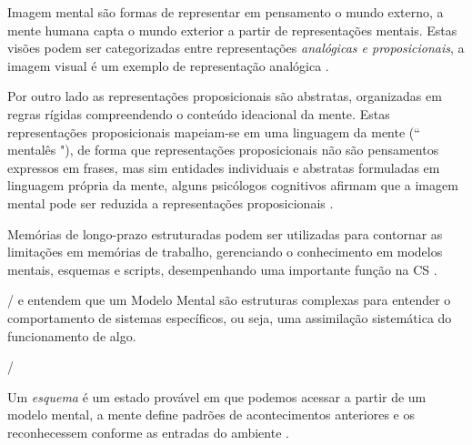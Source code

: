 \documentclass[12pt]{article}
\begin{document}
Imagem mental são formas de representar em pensamento o mundo externo, a mente humana capta o mundo exterior a partir de representações mentais. Estas visões podem ser categorizadas entre representações \textit{analógicas e proposicionais}, a imagem visual é um exemplo de representação analógica \cite{Moreira1996}. 

Por outro lado as representações proposicionais são abstratas, organizadas em regras rígidas compreendendo o conteúdo ideacional da mente. Estas representações proposicionais mapeiam-se em uma linguagem da mente (`` mentalês "), de forma que representações proposicionais não são pensamentos expressos em frases, mas sim entidades individuais e abstratas formuladas em linguagem própria da mente, alguns psicólogos cognitivos afirmam que a imagem mental pode ser reduzida a representações proposicionais  \cite{Moreira1996}.

Memórias de longo-prazo estruturadas podem ser utilizadas para contornar as limitações em memórias de trabalho, gerenciando o conhecimento em modelos mentais, esquemas e scripts, desempenhando uma importante função na CS \cite{Endsley1995}. 

/%
\cite{Endsley1995} e \cite{Endsley2012} entendem que um Modelo Mental são estruturas complexas para entender o comportamento de sistemas específicos, ou seja, uma assimilação sistemática do funcionamento de algo. 

/%

Um \textit{esquema} é um estado provável em que podemos acessar a partir de um modelo mental, a mente define padrões de acontecimentos anteriores e os reconhecessem conforme as entradas do ambiente \cite{Endsley2012}. 
\end{document}
